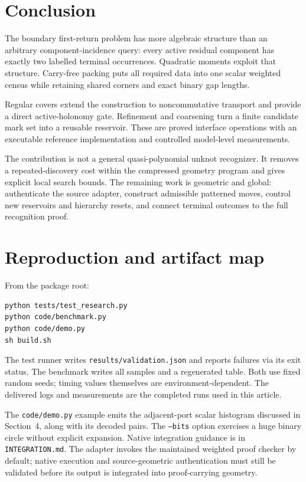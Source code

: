 \documentclass[11pt]{article}
\theoremstyle{definition}\newtheorem{definition}[theorem]{Definition}\newtheorem{example}[theorem]{Example}
\theoremstyle{remark}\newtheorem{remark}[theorem]{Remark}
\newcommand{\code}[1]{\texttt{#1}}
\begin{document}
\section{Conclusion}
The boundary first-return problem has more algebraic structure than an arbitrary component-incidence query: every active residual component has exactly two labelled terminal occurrences. Quadratic moments exploit that structure. Carry-free packing puts all required data into one scalar weighted census while retaining shared corners and exact binary gap lengths.

Regular covers extend the construction to noncommutative transport and provide a direct active-holonomy gate. Refinement and coarsening turn a finite candidate mark set into a reusable reservoir. These are proved interface operations with an executable reference implementation and controlled model-level measurements.

The contribution is not a general quasi-polynomial unknot recognizer. It removes a repeated-discovery cost within the compressed geometry program and gives explicit local search bounds. The remaining work is geometric and global: authenticate the source adapter, construct admissible patterned moves, control new reservoirs and hierarchy resets, and connect terminal outcomes to the full recognition proof.

\appendix
\section{Reproduction and artifact map}
From the package root:
\begin{verbatim}
python tests/test_research.py
python code/benchmark.py
python code/demo.py
sh build.sh
\end{verbatim}
The test runner writes \code{results/validation.json} and reports failures via its exit status. The benchmark writes all samples and a regenerated table. Both use fixed random seeds; timing values themselves are environment-dependent. The delivered logs and measurements are the completed runs used in this article.

The \code{code/demo.py} example emits the adjacent-port scalar histogram discussed in Section~4, along with its decoded pairs. The \code{--bits} option exercises a huge binary circle without explicit expansion. Native integration guidance is in \code{INTEGRATION.md}. The adapter invokes the maintained weighted proof checker by default; native execution and source-geometric authentication must still be validated before its output is integrated into proof-carrying geometry.
\end{document}
